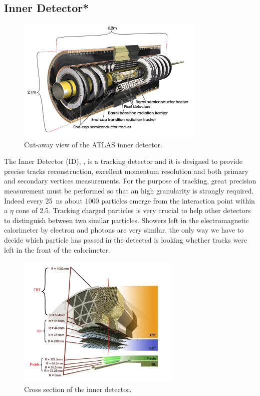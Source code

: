 \subsection{Inner Detector*}
\label{sec:ID}
\begin{figure}[tp]
\centering
\includegraphics[width=0.8\textwidth]{LHC_ATLAS/ID}
\caption{Cut-away view of the ATLAS inner detector.}
\label{fig:id}
\end{figure}

The Inner Detector (ID), \Fig{\ref{fig:id}}, is a tracking detector and it is designed to provide precise tracks reconstruction, excellent momentum resolution and both primary and secondary vertices measurements. For the purpose of tracking, great precision measurement must be performed so that an high granularity is strongly required. Indeed every \SI{25}{\ns} about \num{1000} particles emerge from the interaction point within a $\eta$ cone of \num{2.5}. Tracking charged particles is very crucial to help other detectors to distinguish between two similar particles. Showers left in the electromagnetic calorimeter by electron and photons are very similar, the only way we have to decide which particle has passed in the detected is looking whether tracks were left in the front of the calorimeter.

\begin{figure}[pt]
\centering
\includegraphics[width=0.7\textwidth]{LHC_ATLAS/IDCrossSection}
\caption{Cross section of the inner detector.}
\label{fig:xsecID}
\end{figure}

